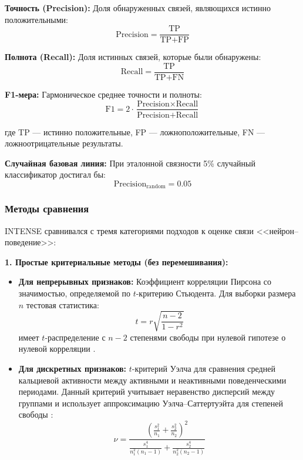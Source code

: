 \textbf{Точность (Precision):} Доля обнаруженных связей, являющихся истинно положительными:
\begin{equation}
\label{eq:precision}
\text{Precision} = \frac{\text{TP}}{\text{TP} + \text{FP}}
\end{equation}

\textbf{Полнота (Recall):} Доля истинных связей, которые были обнаружены:
\begin{equation}
\label{eq:recall}
\text{Recall} = \frac{\text{TP}}{\text{TP} + \text{FN}}
\end{equation}

\textbf{F1-мера:} Гармоническое среднее точности и полноты:
\begin{equation}
\label{eq:f1score}
\text{F1} = 2 \cdot \frac{\text{Precision} \times \text{Recall}}{\text{Precision} +
\text{Recall}}
\end{equation}

где TP --- истинно положительные, FP --- ложноположительные, FN --- ложноотрицательные результаты.

\textbf{Случайная базовая линия:} При эталонной связности 5\% случайный классификатор
достигал бы:
\begin{equation}
\label{eq:random_baseline}
\text{Precision}_{\text{random}} = 0.05
\end{equation}

\subsubsection{Методы сравнения}
\label{sec:comparison_methods}

INTENSE сравнивался с тремя категориями подходов к оценке связи <<нейрон--поведение>>:

\textbf{1. Простые критериальные методы (без перемешивания):}
\begin{itemize}
\item \textbf{Для непрерывных признаков:} Коэффициент корреляции Пирсона со значимостью, определяемой по $t$-критерию Стьюдента. Для выборки размера $n$ тестовая статистика:
\begin{equation}
\label{eq:pearson_test}
t = r\sqrt{\frac{n-2}{1-r^2}}
\end{equation}
имеет $t$-распределение с $n-2$ степенями свободы при нулевой гипотезе о нулевой корреляции \citep{Fisher1915}.

\item \textbf{Для дискретных признаков:} $t$-критерий Уэлча для сравнения средней кальциевой активности
между активными и неактивными поведенческими периодами. Данный критерий учитывает неравенство
дисперсий между группами и использует аппроксимацию Уэлча--Саттертуэйта для степеней
свободы \citep{Welch1947}:
\begin{equation}
\label{eq:welch_df}
\nu = \frac{\left(\frac{s_1^2}{n_1} +
\frac{s_2^2}{n_2}\right)^2}{\frac{s_1^4}{n_1^2(n_1-1)} + \frac{s_2^4}{n_2^2(n_2-1)}}
\end{equation}
\end{itemize}

